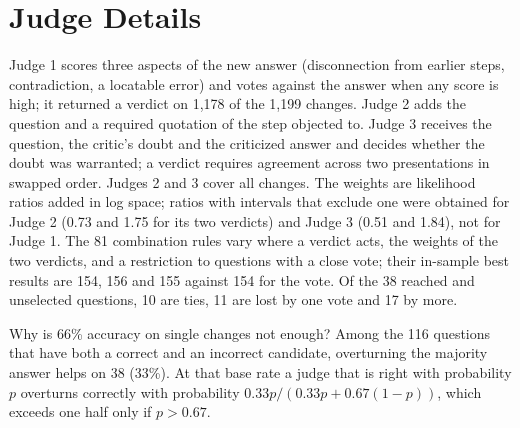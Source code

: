 \documentclass[11pt]{article}
\begin{document}
\section{Judge Details}
\label{app:judges}

Judge 1 scores three aspects of the new answer (disconnection from earlier steps, contradiction, a locatable error) and votes against the answer when any score is high; it returned a verdict on 1{,}178 of the 1{,}199 changes.
Judge 2 adds the question and a required quotation of the step objected to.
Judge 3 receives the question, the critic's doubt and the criticized answer and decides whether the doubt was warranted; a verdict requires agreement across two presentations in swapped order.
Judges 2 and 3 cover all changes.
The weights are likelihood ratios added in log space; ratios with intervals that exclude one were obtained for Judge 2 (0.73 and 1.75 for its two verdicts) and Judge 3 (0.51 and 1.84), not for Judge 1.
The 81 combination rules vary where a verdict acts, the weights of the two verdicts, and a restriction to questions with a close vote; their in-sample best results are 154, 156 and 155 against 154 for the vote.
Of the 38 reached and unselected questions, 10 are ties, 11 are lost by one vote and 17 by more.

Why is 66\% accuracy on single changes not enough?
Among the 116 questions that have both a correct and an incorrect candidate, overturning the majority answer helps on 38 (33\%).
At that base rate a judge that is right with probability $p$ overturns correctly with probability $0.33p/(0.33p+0.67(1-p))$, which exceeds one half only if $p>0.67$.
\end{document}
